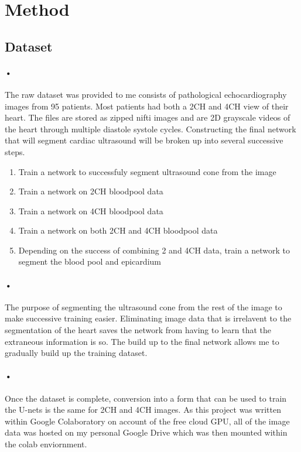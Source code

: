\documentclass{article}
\begin{document}
\section{Method}
\subsection{Dataset}
\paragraph{•}
The raw dataset was provided to me consists of pathological echocardiography images from 95 patients. 
Most patients had both a 2CH and 4CH view of their heart. The files are stored as zipped nifti images and are 2D grayscale videos of the heart through multiple diastole systole cycles.
Constructing the final network that will segment cardiac ultrasound will be broken up into several successive steps.

\begin{enumerate}
\item Train a network to successfuly segment ultrasound cone from the image
\item Train a network on 2CH bloodpool data
\item Train a network on 4CH bloodpool data
\item Train a network on both 2CH and 4CH bloodpool data
\item Depending on the success of combining 2 and 4CH data, train a network to segment the blood pool and epicardium

\end{enumerate}
\paragraph{•}
The purpose of segmenting the ultrasound cone from the rest of the image to make successive training easier.
Eliminating image data that is irrelavent to the segmentation of the heart saves the network from having to learn that the extraneous information is so. The build up to the final network allows me to gradually build up the training dataset.


\paragraph{•}
Once the dataset is complete, conversion into a form that can be used to train the U-nets is the same for 2CH and 4CH images. As this project was written within Google Colaboratory on account of the free cloud GPU, all of the image data was hosted on my personal Google Drive which was then mounted within the colab enviornment. 
\end{document}
